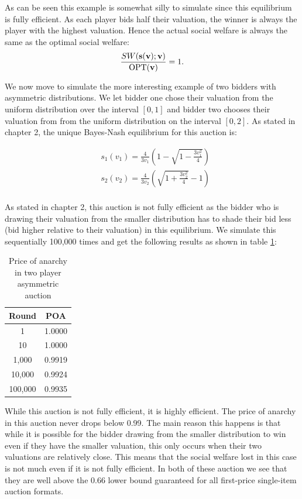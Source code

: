 \documentclass[12pt,twoside]{reedthesis}
\begin{document}
As can be seen this example is somewhat silly to simulate since this equilibrium is fully efficient. As each player bids half their valuation, the winner is always the player with the highest valuation. Hence the actual social welfare is always the same as the optimal social welfare: $$\frac{SW(\textbf{s}(\textbf{v}); \textbf{v})}{\text{OPT}(\textbf{v})} = 1.$$

We now move to simulate the more interesting example of two bidders with asymmetric distributions. We let bidder one chose their valuation from the uniform distribution over the interval $[ 0,1]$ and bidder two chooses their valuation from from the uniform distribution on the interval $[0,2]$. As stated in chapter 2, the unique Bayes-Nash equilibrium for this auction is:

\begin{align*}
&s_1(v_1) = \frac{4}{3 v_1} \left(1 - \sqrt{1 - \frac{3v_1^2}{4}}\right)\\
&s_2(v_2) = \frac{4}{3 v_2} \left(\sqrt{1 + \frac{3v_2^2}{4}} - 1 \right)\\
\end{align*}

As stated in chapter 2, this auction is not fully efficient as the bidder who is drawing their valuation from the smaller distribution has to shade their bid less (bid higher relative to their valuation) in this equilibrium. We simulate this sequentially 100,000 times and get the following results as shown in table \ref{table:2}:
\begin{table}[h!]
	\begin{center}
		\begin{tabular}{ |c|c| }
			\hline
			Round & POA \\
			\hline
			1 & 1.0000 \\
			10 & 1.0000 \\
			1,000 & 0.9919 \\
			10,000 & 0.9924 \\
			100,000 & 0.9935 \\
			\hline
		\end{tabular}
		\caption{Price of anarchy in two player asymmetric auction}
		\label{table:2}
	\end{center} 
\end{table}

While this auction is not fully efficient, it is highly efficient. The price of anarchy in this auction never drops below 0.99. The main reason this happens is that while it is possible for the bidder drawing from the smaller distribution to win even if they have the smaller valuation, this only occurs when their two valuations are relatively close. This means that the social welfare lost in this case is not much even if it is not fully efficient. In both of these auction we see that they are well above the $0.66$ lower bound guaranteed for all first-price single-item auction formats.
\end{document}
